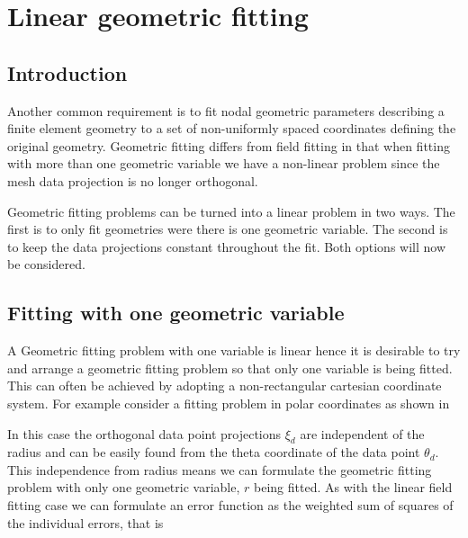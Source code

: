 \section{Linear geometric fitting}
\label{sec:lineargeometricfitting}

\subsection{Introduction}

Another common requirement is to fit nodal geometric parameters describing a
finite element geometry to a set of non-uniformly spaced coordinates defining
the original geometry. Geometric fitting differs from field fitting in that
when fitting with more than one geometric variable we have a non-linear
problem since the mesh data projection is no longer orthogonal.

Geometric fitting problems can be turned into a linear problem in two
ways. The first is to only fit geometries were there is one geometric
variable. The second is to keep the data projections constant throughout the
fit. Both options will now be considered.

\subsection{Fitting with one geometric variable}

A Geometric fitting problem with one variable is linear hence it is desirable
to try and arrange a geometric fitting problem so that only one variable is
being fitted. This can often be achieved by adopting a non-rectangular
cartesian coordinate system. For example consider a fitting problem in polar
coordinates as shown in 


\begin{figure}[htpb] \centering
%  
  \label{fig:polargeomfit}
\end{figure}

In this case the orthogonal data point projections $\xi_{d}$ are independent
of the radius and can be easily found from the theta coordinate of the data
point $\theta_{d}$. This independence from radius means we can formulate the
geometric fitting problem with only one geometric variable, $r$ being
fitted. As with the linear field fitting case we can formulate an error
function as the weighted sum of squares of the individual errors, that is

